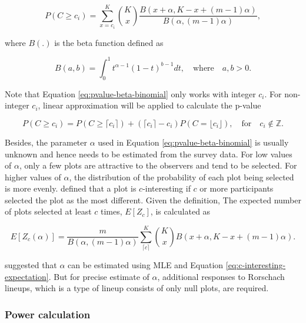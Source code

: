 \documentclass[]{interact}
\theoremstyle{plain}%
\theoremstyle{definition}
\theoremstyle{remark}
\begin{document}
\begin{equation} \label{eq:pvalue-beta-binomial}
P(C \geq c_i) = \sum_{x=c_i}^{K}{K \choose x}\frac{B(x + \alpha, K - x + (m - 1)\alpha)}{B(\alpha, (m-1)\alpha)},
\end{equation}

\noindent where \(B(.)\) is the beta function defined as

\begin{equation} \label{eq:betafunction}
B(a, b) = \int_{0}^{1}t^{\alpha - 1}(1-t)^{b-1}dt,\quad \text{where}\quad a,b>0. 
\end{equation}

Note that Equation \ref{eq:pvalue-beta-binomial} only works with integer
\(c_i\). For non-integer \(c_i\), linear approximation will be applied
to calculate the p-value

\begin{equation} \label{eq:pvalue-beta-binomial-approx}
P(C \geq c_i) = P(C \geq \lceil c_i \rceil) + (\lceil c_i \rceil - c_i) P(C = \lfloor c_i \rfloor), \quad \text{for}\quad c_i \notin \mathbb{Z}.
\end{equation}

Besides, the parameter \(\alpha\) used in Equation
\ref{eq:pvalue-beta-binomial} is usually unknown and hence needs to be
estimated from the survey data. For low values of \(\alpha\), only a few
plots are attractive to the observers and tend to be selected. For
higher values of \(\alpha\), the distribution of the probability of each
plot being selected is more evenly. \citet{vanderplas2021statistical}
defined that a plot is \(c\)-interesting if \(c\) or more participants
selected the plot as the most different. Given the definition, The
expected number of plots selected at least \(c\) times, \(E[Z_c]\), is
calculated as

\begin{equation} \label{eq:c-interesting-expectation}
E[Z_c(\alpha)] = \frac{m}{B(\alpha, (m-1)\alpha)}\sum_{\lceil c \rceil}^{K}{K \choose x} B(x + \alpha, K - x + (m-1)\alpha).\end{equation}

\citet{vanderplas2021statistical} suggested that \(\alpha\) can be
estimated using MLE and Equation \ref{eq:c-interesting-expectation}. But
for precise estimate of \(\alpha\), additional responses to Rorschach
lineups, which is a type of lineup consists of only null plots, are
required.

\hypertarget{power-calculation}{%
\subsubsection{Power calculation}\label{power-calculation}}
\end{document}

